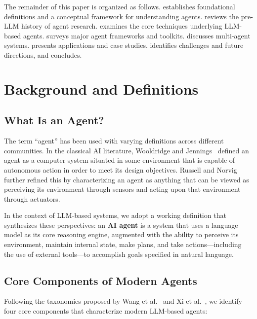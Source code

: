 \documentclass[11pt,a4paper]{article}
\begin{document}
The remainder of this paper is organized as follows.  establishes foundational definitions and a conceptual framework for understanding agents.  reviews the pre-LLM history of agent research.  examines the core techniques underlying LLM-based agents.  surveys major agent frameworks and toolkits.  discusses multi-agent systems.  presents applications and case studies.  identifies challenges and future directions, and  concludes.

\section{Background and Definitions}
\label{sec:background}

\subsection{What Is an Agent?}

The term ``agent'' has been used with varying definitions across different communities. In the classical AI literature, Wooldridge and Jennings~\citep{wooldridge1995intelligent} defined an agent as a computer system situated in some environment that is capable of autonomous action in order to meet its design objectives. Russell and Norvig further refined this by characterizing an agent as anything that can be viewed as perceiving its environment through sensors and acting upon that environment through actuators.

In the context of LLM-based systems, we adopt a working definition that synthesizes these perspectives: an \textbf{AI agent} is a system that uses a language model as its core reasoning engine, augmented with the ability to perceive its environment, maintain internal state, make plans, and take actions---including the use of external tools---to accomplish goals specified in natural language.

\subsection{Core Components of Modern Agents}

Following the taxonomies proposed by Wang et al.~\citep{wang2024survey} and Xi et al.~\citep{xi2023rise}, we identify four core components that characterize modern LLM-based agents:
\end{document}
